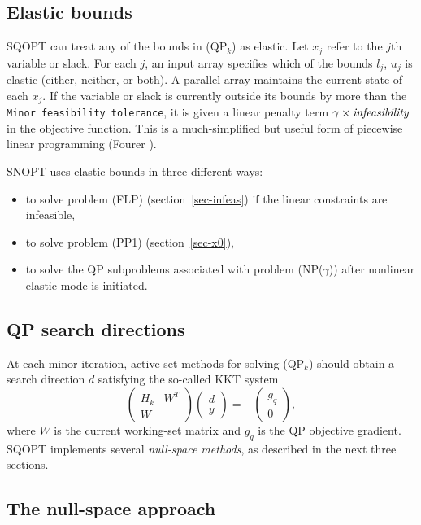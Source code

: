 \documentclass[draft,leqno,onefignum,onetabnum]{siamltex}
\def\QPk {QP$_k$}
\def\v#1{\texttt{#1}}
\def\SNOPT {{\small SNOPT}}
\def\SQOPT {{\small SQOPT}}
\newcommand{\pmat}[1]{\begin{pmatrix}#1\end{pmatrix}}
\begin{document}
\subsection{Elastic bounds}    \label{sec-elastic}

\SQOPT{} can treat any of the bounds in (\QPk) as elastic.
Let $x_j$ refer to the $j$th variable or slack.
For each $j$, an input array specifies which of the bounds
$l_j$, $u_j$ is elastic (either, neither, or both).
A parallel array maintains the current state of each $x_j$.
If the variable or slack is currently outside its bounds by more
than the \v{Minor feasibility tolerance}, it is given a linear
penalty term $\gamma \times \hbox{\emph{infeasibility}}$
in the objective function.  This is a much-simplified but useful
form of piecewise linear programming (Fourer \cite{Four85,Four88,Four92}).

\SNOPT{} uses elastic bounds in three different ways:
\begin{itemize}
\item to solve problem (FLP) (section~\ref{sec-infeas})
      if the linear constraints are infeasible,
\item to solve problem (PP1) (section~\ref{sec-x0}),
\item to solve the QP subproblems associated with problem (NP($\gamma$))
      after nonlinear elastic mode is initiated.
\end{itemize}



\subsection{QP search directions} \label{sec-KKT}

At each minor iteration, active-set methods for solving (\QPk)
should obtain a search direction $d$ satisfying the so-called KKT system
\begin{equation}  \label{eqn-KKT}
   \pmat{ H_k & W^T
       \\ W        } \pmat{d\\y}  =  - \pmat{g_q \\ 0},
\end{equation}
where $W$ is the current working-set matrix and
$g_q$ is the QP objective gradient.
\SQOPT{} implements several \emph{null-space methods},
as described in the next three sections.



\subsection{The null-space approach}    \label{sec-nullspace}
\end{document}
